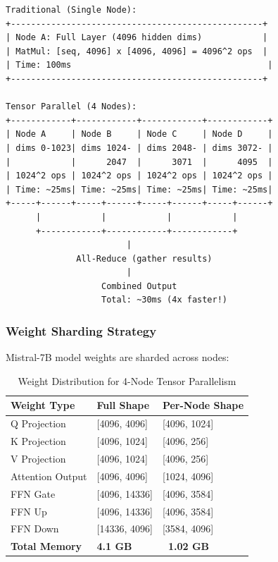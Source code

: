 \documentclass[11pt,a4paper]{article}
\begin{document}
\begin{lstlisting}[caption={Tensor Parallel Layer Computation}]
Traditional (Single Node):
+--------------------------------------------------+
| Node A: Full Layer (4096 hidden dims)            |
| MatMul: [seq, 4096] x [4096, 4096] = 4096^2 ops  |
| Time: 100ms                                       |
+--------------------------------------------------+

Tensor Parallel (4 Nodes):
+------------+------------+------------+------------+
| Node A     | Node B     | Node C     | Node D     |
| dims 0-1023| dims 1024- | dims 2048- | dims 3072- |
|            |      2047  |      3071  |      4095  |
| 1024^2 ops | 1024^2 ops | 1024^2 ops | 1024^2 ops |
| Time: ~25ms| Time: ~25ms| Time: ~25ms| Time: ~25ms|
+-----+------+-----+------+-----+------+-----+------+
      |            |            |            |
      +------------+------------+------------+
                        |
              All-Reduce (gather results)
                        |
                   Combined Output
                   Total: ~30ms (4x faster!)
\end{lstlisting}

\subsubsection{Weight Sharding Strategy}

Mistral-7B model weights are sharded across nodes:

\begin{table}[H]
\centering
\caption{Weight Distribution for 4-Node Tensor Parallelism}
\begin{tabular}{|l|l|l|}
\hline
\textbf{Weight Type} & \textbf{Full Shape} & \textbf{Per-Node Shape} \\
\hline
Q Projection & [4096, 4096] & [4096, 1024] \\
K Projection & [4096, 1024] & [4096, 256] \\
V Projection & [4096, 1024] & [4096, 256] \\
Attention Output & [4096, 4096] & [1024, 4096] \\
FFN Gate & [4096, 14336] & [4096, 3584] \\
FFN Up & [4096, 14336] & [4096, 3584] \\
FFN Down & [14336, 4096] & [3584, 4096] \\
\hline
\textbf{Total Memory} & \textbf{4.1 GB} & \textbf{~1.02 GB} \\
\hline
\end{tabular}
\end{table}
\end{document}
